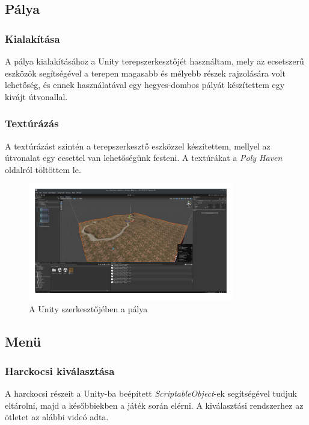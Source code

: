 \documentclass[
]{thesis-ekf}
\theoremstyle{definition}
\theoremstyle{remark}
\begin{document}
\subsection{Pálya}

\subsubsection{Kialakítása}

A pálya kialakításához a Unity terepszerkesztőjét használtam, mely az ecsetszerű eszközök segítségével a terepen magasabb és mélyebb részek rajzolására volt lehetőség, és ennek használatával egy hegyes-dombos pályát készítettem egy kivájt útvonallal.
\subsubsection{Textúrázás}

A textúrázást szintén a terepszerkesztő eszközzel készítettem, mellyel az útvonalat egy ecsettel van lehetőségünk festeni. A textúrákat a \emph{Poly Haven}\cite{polyhaven} oldalról töltöttem le.

\begin{figure}[H]
    \centering
    \includegraphics[width=0.8\textwidth]{screenshots/mapineditor.png}
    \caption{A Unity szerkesztőjében a pálya}
    \label{fig:mapineditor}
\end{figure}

\subsection{Menü}

\subsubsection{Harckocsi kiválasztása}

A harckocsi részeit a Unity-ba beépített \emph{ScriptableObject}-ek segítségével tudjuk eltárolni, majd a későbbiekben a játék során elérni. A kiválasztási rendszerhez az ötletet az alábbi videó\cite{selectionmenu} adta.
\end{document}
